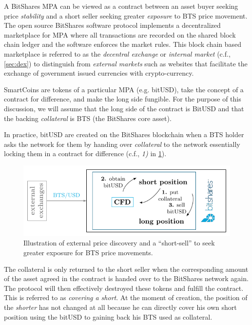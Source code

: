 \label{sec:mpa}

A BitShares MPA can be viewed as a contract between an asset buyer seeking
price \emph{stability} and a short seller seeking greater \emph{exposure} to
BTS price movement. The open source BitShares software protocol implements a
decentralized marketplace for MPA where all transactions are recorded on the
shared block chain ledger and the software enforces the market rules. This
block chain based marketplace is referred to as the \emph{decentral exchange}
or \emph{internal market} (c.f., \cref{sec:dex}) to distinguish from
\emph{external markets} such as websites that facilitate the exchange of
government issued currencies with crypto-currency.

SmartCoins are tokens of a particular MPA (e.g. bitUSD), take the concept of a
contract for difference, and make the long side fungible. For the purpose of
this discussion, we will assume that the long side of the contract is BitUSD
and that the backing \emph{collateral} is BTS (the BitShares core asset).

In practice, bitUSD are created on the BitShares blockchain when a BTS holder
asks the network for them by handing over \emph{collateral} to the network
essentially locking them in a contract for difference (c.f., \emph{1)} in
\cref{fig:btsdex}).

\begin{figure}[!htp]
 \begin{center}
  \includegraphics[width=.8\linewidth]{figures/external-pricefeed}
 \end{center}
 \caption{Illustration of external price discovery and a ``short-sell'' to seek
          greater exposure for BTS price movements.}
 \label{fig:btsdex}
\end{figure}

The collateral is only returned to the short seller when the corresponding
amount of the asset agreed in the contract is handed over to the BitShares
network again. The protocol will then effectively destroyed these tokens and
fulfill the contract. This is referred to as \emph{covering a
short}. At the moment of creation, the position of the \emph{shorter} has not
changed at all because he can directly cover his own short position using the
bitUSD to gaining back his BTS used as collateral.

